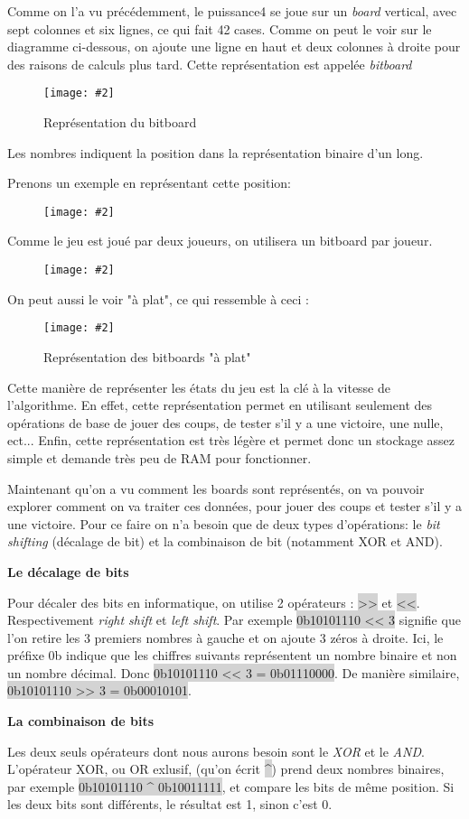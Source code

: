 \documentclass[a4paper]{article}
\newcommand{\img}[3][]{
    \begin{figure}[H]
        \centering
        \texttt{[image: \#2]}
        \caption{#1}    
    \end{figure}
}
\newcommand{\inlinecode}[1]{\colorbox{lightgray}{#1}}
\newcommand{\ptitle}[1]{\vspace{10pt}
{\large \textbf{#1}}}
\begin{document}
    Comme on l'a vu précédemment, le puissance4 se joue sur un \textit{board} vertical, avec sept colonnes et six lignes, ce qui fait 42 cases. Comme on peut le voir sur le diagramme ci-dessous, on ajoute une ligne en haut et deux colonnes à droite pour des raisons de calculs plus tard. Cette représentation est appelée \textit{bitboard}
    \img[Représentation du bitboard]{Images/BitBoard.png}{0.7}
    Les nombres indiquent la position dans la représentation binaire d'un long.

    Prenons un exemple en représentant cette position:
    \img{Images/ExempleBitBoardsPt1.png}{0.3}

    Comme le jeu est joué par deux joueurs, on utilisera un bitboard par joueur.
    \img{Images/ExempleBitBoardsPt2.png}{1}
    On peut aussi le voir "à plat", ce qui ressemble à ceci :
    \img[Représentation des bitboards "à plat"]{Images/FlatBiboard.png}{1}

    Cette manière de représenter les états du jeu est la clé à la vitesse de l'algorithme. En effet, cette représentation permet en utilisant seulement des opérations de base de jouer des coups, de tester s'il y a une victoire, une nulle, ect... Enfin, cette représentation est très légère et permet donc un stockage assez simple et demande très peu de RAM pour fonctionner.

    Maintenant qu'on a vu comment les boards sont représentés, on va pouvoir explorer comment on va traiter ces données, pour jouer des coups et tester s'il y a une victoire. Pour ce faire on n'a besoin que de deux types d'opérations: le \textit{bit shifting} (décalage de bit) et la combinaison de bit (notamment XOR et AND).

    \ptitle{Le décalage de bits}

    Pour décaler des bits en informatique, on utilise 2 opérateurs : \inlinecode{>>} et \inlinecode{<<}. Respectivement \textit{right shift} et \textit{left shift}. Par exemple \inlinecode{0b10101110 << 3} signifie que l'on retire les 3 premiers nombres à gauche et on ajoute 3 zéros à droite. Ici, le préfixe 0b indique que les chiffres suivants représentent un nombre binaire et non un nombre décimal. Donc \inlinecode{0b10101110 << 3 = 0b01110000}. De manière similaire, \inlinecode{0b10101110 >> 3 = 0b00010101}.
    
    \ptitle{La combinaison de bits}

    Les deux seuls opérateurs dont nous aurons besoin sont le \textit{XOR} et le \textit{AND}. L'opérateur XOR, ou OR exlusif, (qu'on écrit \inlinecode{\^{}}) prend deux nombres binaires, par exemple \inlinecode{0b10101110 \^{} 0b10011111}, et compare les bits de même position. Si les deux bits sont différents, le résultat est 1, sinon c'est 0.
\end{document}
